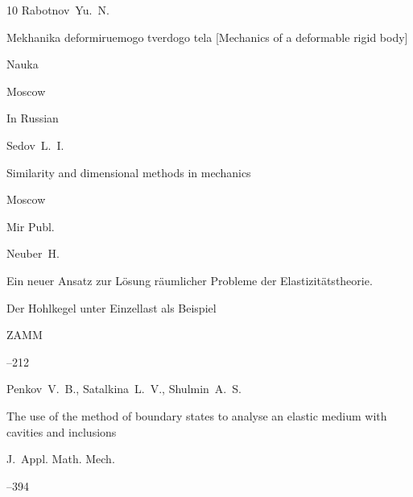 \begin{thebibliography}{10}
\by Rabotnov~Yu.~N.

\book Mekhanika deformiruemogo tverdogo tela \rm [Mechanics of a deformable rigid body]


\publ Nauka


\publaddr Moscow

\lang In Russian






\by  Sedov~L.~I.

\book Similarity and dimensional methods in mechanics


\publaddr Moscow

\publ Mir Publ.






\by Neuber~H.

\paper Ein neuer Ansatz zur L\"osung r\"aumlicher Probleme der Elastizit\"atstheorie. 

Der Hohlkegel unter Einzellast als Beispiel

\jour  ZAMM




--212





\by Penkov~V.~B., Satalkina~L.~V., Shulmin~A.~S.

\paper The use of the method of boundary states to analyse an elastic medium with cavities and inclusions

\jour  J.~Appl. Math. Mech.




--394








\end{thebibliography}
